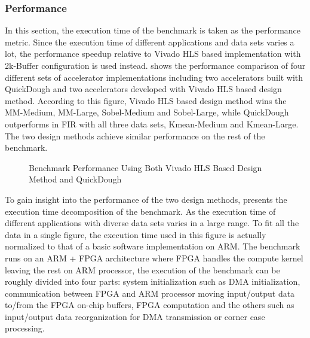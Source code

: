 \subsubsection{Performance}
In this section, the execution time of the benchmark is taken as the performance metric. Since the execution time of different applications and data sets varies a lot, the performance speedup relative to Vivado HLS based implementation with 2k-Buffer configuration is used instead.  shows the performance comparison of four different sets of accelerator implementations including two accelerators built with QuickDough and two accelerators developed with Vivado HLS based design method. According to this figure, Vivado HLS based design method wins the MM-Medium, MM-Large, Sobel-Medium and Sobel-Large, while QuickDough outperforms in FIR with all three data sets, Kmean-Medium and Kmean-Large. The two design methods achieve similar performance on the rest of the benchmark. 

\begin{figure*}[h]
\caption{Benchmark Performance Using Both Vivado HLS Based Design Method and QuickDough}
\label{fig:real-perf}
\end{figure*}

To gain insight into the performance of the two design methods,  presents the execution time decomposition of the benchmark. As the execution time of different applications with diverse data sets varies in a large range. To fit all the data in a single figure, the execution time used in this figure is actually normalized to that of a basic software implementation on ARM. The benchmark runs on an ARM + FPGA architecture where FPGA handles the compute kernel leaving the rest on ARM processor, the execution of the benchmark can be roughly divided into four parts: system initialization such as DMA initialization, communication between FPGA and ARM processor moving input/output data to/from the FPGA on-chip buffers, FPGA computation and the others such as input/output data reorganization for DMA transmission or corner case processing. 

